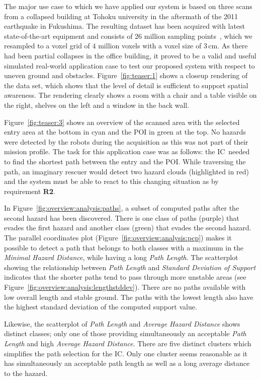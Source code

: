 \documentclass[conference,10pt,letter]{IEEEtran}
\def\IC{IC}
\begin{document}
The major use case to which we have applied our system is based on three scans from a collapsed building at Tohoku university in the aftermath of the 2011 earthquake in Fukushima. The resulting dataset has been acquired with latest state-of-the-art equipment and consists of $26$ million sampling points~\cite{journals/jfr/NagataniKOOYTNYKFK13}, which we resampled to a voxel grid of $4$ million voxels with a voxel size of 3\,cm. As there had been partial collapses in the office building, it proved to be a valid and useful simulated real-world application case to test our proposed system with respect to uneven ground and obstacles. Figure~\ref{fig:teaser:1} shows a closeup rendering of the data set, which shows that the level of detail is sufficient to support spatial awareness. The rendering clearly shows a room with a chair and a table visible on the right, shelves on the left and a window in the back wall.

Figure~\ref{fig:teaser:3} shows an overview of the scanned area with the selected entry area at the bottom in cyan and the POI in green at the top. No hazards were detected by the robots during the acquisition as this was not part of their mission profile. The task for this application case was as follows: the \IC\ needed to find the shortest path between the entry and the POI. While traversing the path, an imaginary rescuer would detect two hazard clouds (highlighted in red) and the system must be able to react to this changing situation as by requirement {\bfseries R2}.

In Figure~\ref{fig:overview:analysis:paths}, a subset of computed paths after the second hazard has been discovered. There is one class of paths (purple) that evades the first hazard and another class (green) that evades the second hazard. The parallel coordinates plot (Figure~\ref{fig:overview:analysis:pcp}) makes it possible to detect a path that belongs to both classes with a maximum in the \emph{Minimal Hazard Distance}, while having a long \emph{Path Length}. The scatterplot showing the relationship between \emph{Path Length} and \emph{Standard Deviation of Support} indicates that the shorter paths tend to pass through more unstable areas (see Figure~\ref{fig:overview:analysis:lengthstddev}). There are no paths available with low overall length and stable ground. The paths with the lowest length also have the highest standard deviation of the computed support value.

Likewise, the scatterplot of \emph{Path Length} and \emph{Average Hazard Distance} shows distinct classes; only one of those providing simultaneously an acceptable \emph{Path Length} and high \emph{Average Hazard Distance}. There are five distinct clusters which simplifies the path selection for the \IC . Only one cluster seems reasonable as it has simultaneously an acceptable path length as well as a long average distance to the hazard.
\end{document}
